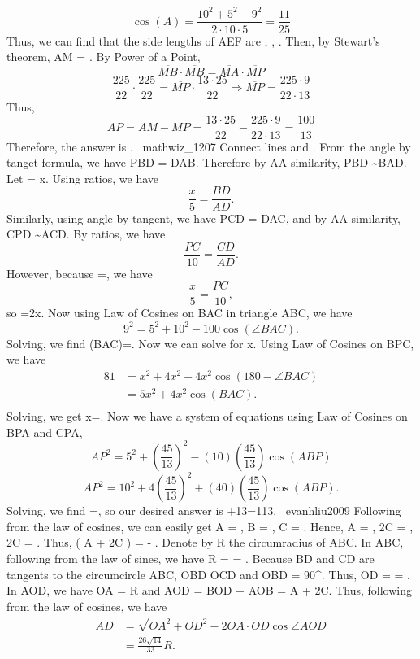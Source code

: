 \documentclass{article}%
\begin{document}
\[\cos(A) = \frac{10^2 + 5^2 - 9^2}{2 \cdot 10 \cdot 5} = \frac{11}{25}\] 
Thus, we can find that the side lengths of \]\triangle AEF\] are \], , \]. Then, by Stewart's theorem, \]AM = \]. By Power of a Point, 
\[\overline{MB} \cdot \overline{MB} = \overline{MA} \cdot \overline{MP}\]
\[\frac{225}{22} \cdot \frac{225}{22} = \overline{MP} \cdot \frac{13 \cdot 25}{22} \Rightarrow \overline{MP} = \frac{225 \cdot 9}{22 \cdot 13}\]
Thus, 
\[AP = AM - MP = \frac{13 \cdot 25}{22} - \frac{225 \cdot 9}{22 \cdot 13} = \frac{100}{13}\]
Therefore, the answer is \].
~mathwiz_1207
Connect lines \]\] and \]\]. From the angle by tanget formula, we have \]\angle PBD = \angle DAB\]. Therefore by AA similarity, \]\triangle PBD \sim \triangle BAD\]. Let \] = x\]. Using ratios, we have \[\frac{x}{5}=\frac{BD}{AD}.\] Similarly, using angle by tangent, we have \]\angle PCD = \angle DAC\], and by AA similarity, \]\triangle CPD \sim \triangle ACD\]. By ratios, we have \[\frac{PC}{10}=\frac{CD}{AD}.\] However, because \]=\], we have \[\frac{x}{5}=\frac{PC}{10},\] so \]=2x.\] Now using Law of Cosines on \]\angle BAC\] in triangle \]\triangle ABC\], we have \[9^2=5^2+10^2-100\cos(\angle BAC).\] Solving, we find \]\cos(\angle BAC)=\]. Now we can solve for \]x\]. Using Law of Cosines on \]\triangle BPC,\] we have 
\begin{align*}
81&=x^2+4x^2-4x^2\cos(180-\angle BAC) \\ 
&= 5x^2+4x^2\cos(BAC). \\
\end{align*}
Solving, we get \]x=.\] Now we have a system of equations using Law of Cosines on \]\triangle BPA\] and \]\triangle CPA\], \[AP^2=5^2+\left(\frac{45}{13}\right)^2 -(10) \left(\frac{45}{13} \right)\cos(ABP)\]
\[AP^2=10^2+4 \left(\frac{45}{13} \right)^2 + (40) \left(\frac{45}{13} \right)\cos(ABP).\]
Solving, we find \]=\], so our desired answer is +13={113}\].
~evanhliu2009
Following from the law of cosines, we can easily get \]\cos A = \], \]\cos B = \], \]\cos C = \].
Hence, \]\sin A = \], \]\cos 2C = \], \]\sin 2C = \].
Thus, \]\cos \left( A + 2C \right) = - \].
Denote by \]R\] the circumradius of \]\triangle ABC\].
In \]\triangle ABC\], following from the law of sines, we have \]R =  = \].
Because \]BD\] and \]CD\] are tangents to the circumcircle \]ABC\], \]\triangle OBD \cong \triangle OCD\] and \]\angle OBD = 90^\circ\].
Thus, \]OD =  = \].
In \]\triangle AOD\], we have \]OA = R\] and \]\angle AOD = \angle BOD + \angle AOB = A + 2C\].
Thus, following from the law of cosines, we have
\begin{align*}
AD & = \sqrt{OA^2 + OD^2 - 2 OA \cdot OD \cos \angle AOD} \\
& = \frac{26 \sqrt{14}}{33} R.
\end{align*}
\end{document}
